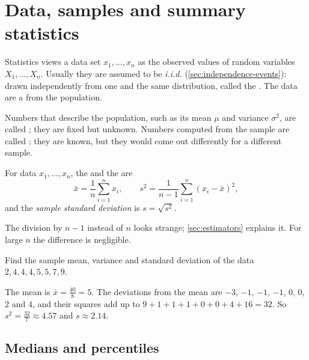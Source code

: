 \section{Data, samples and summary statistics}\label{sec:descriptive}

Statistics views a data set $x_1, \dots, x_n$ as the observed values of random
variables $X_1, \dots, X_n$. Usually they are assumed to be \emph{i.i.d.}
(\cref{sec:independence-events}): drawn independently from one and the same
distribution, called the . The data are a  from
the population.

Numbers that describe the population, such as its mean $\mu$ and variance
$\sigma^2$, are called ; they are fixed
but unknown. Numbers computed from the sample are called
; they are known, but they would come out
differently for a different sample.

\begin{definition}\label{def:sample-stats}
For data $x_1, \dots, x_n$, the  and the 
are
\[
  \bar x = \frac1n\sum_{i=1}^n x_i,
  \qquad
  s^2 = \frac{1}{n-1}\sum_{i=1}^n (x_i - \bar x)^2 ,
\]
and the \emph{sample standard deviation} is $s = \sqrt{s^2}$.
\end{definition}

The division by $n - 1$ instead of $n$ looks strange; \cref{sec:estimators}
explains it. For large $n$ the difference is negligible.

\begin{example}\label{ex:summary-stats}
Find the sample mean, variance and standard deviation of the data
$2, 4, 4, 4, 5, 5, 7, 9$.

\sol The mean is $\bar x = \frac{40}{8} = 5$. The deviations from the mean are
$-3$, $-1$, $-1$, $-1$, $0$, $0$, $2$ and $4$, and their squares add up to
$9 + 1 + 1 + 1 + 0 + 0 + 4 + 16 = 32$. So $s^2 = \frac{32}{7} \approx 4.57$ and
$s \approx 2.14$.
\end{example}

\subsection{Medians and percentiles}

